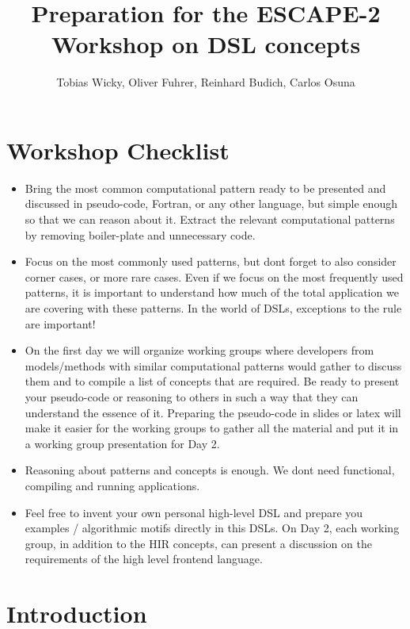 \documentclass[a4paper,10pt]{scrartcl}
\title{Preparation for the ESCAPE-2 Workshop on DSL concepts}
\author{Tobias Wicky, Oliver Fuhrer, Reinhard Budich, Carlos Osuna}
\begin{document}
\maketitle

\section{Workshop Checklist}

\begin{itemize}
	\item Bring the most common computational pattern ready to be presented and discussed in pseudo-code, Fortran, or any other language, but simple enough so that we can reason about it. Extract the relevant computational patterns by removing boiler-plate and unnecessary code.
	\item Focus on the most commonly used patterns, but dont forget to also consider corner cases, or more rare cases. Even if we focus on the most frequently used patterns, it is important to understand how much of the total application we are covering with these patterns. In the world of DSLs, exceptions to the rule are important!
	\item On the first day we will organize working groups where developers from models/methods with similar computational patterns would gather to discuss them and to compile a list of concepts that are required. Be ready to present your pseudo-code or reasoning to others in such a way that they can understand the essence of it.
	Preparing the pseudo-code in slides or latex will make it easier for the working groups to gather all the material and put it in a working group presentation for Day 2.
	\item Reasoning about patterns and concepts is enough. We dont need functional, compiling and running applications.
	\item Feel free to invent your own personal high-level DSL and prepare you examples / algorithmic motifs directly in this DSLs. On Day 2, each working group, in addition to the HIR concepts, can present a discussion on the requirements of the high level frontend language.
\end{itemize}

\section{Introduction}
\end{document}
